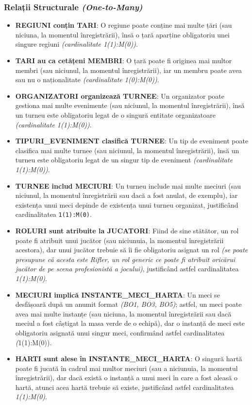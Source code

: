 \documentclass[11pt, a4paper]{article}
\begin{document}
\subsubsection{Relații Structurale \textit{(One-to-Many)}}
\begin{itemize}
    \item \textbf{REGIUNI conțin TARI}: O regiune poate conține mai multe țări (sau niciuna, la momentul înregistrării), însă o țară aparține obligatoriu unei singure regiuni \textit{(cardinalitate 1(1):M(0))}.
    \item \textbf{TARI au ca cetățeni MEMBRI}: O țară poate fi originea mai multor membri (sau niciunul, la momentul înregistrării), iar un membru poate avea sau nu o naționalitate \textit{(cardinalitate 1(0):M(0))}.
    \item \textbf{ORGANIZATORI organizează TURNEE}: Un organizator poate gestiona mai multe evenimente (sau niciunul, la momentul înregistrării), însă un turneu este obligatoriu legat de o singură entitate organizatoare \textit{(cardinalitate 1(1):M(0))}.
    \item \textbf{TIPURI\_EVENIMENT clasifică TURNEE}: Un tip de eveniment poate clasifica mai multe turnee (sau niciunul, la momentul înregistrării), însă un turneu este obligatoriu legat de un singur tip de eveniment \textit{(cardinalitate 1(1):M(0))}.
    \item \textbf{TURNEE includ MECIURI}: Un turneu include mai multe meciuri (sau niciunul, la momentul înregistrării sau dacă a fost anulat, de exemplu), iar existența unui meci depinde de existența unui turneu organizat, justificând cardinalitatea \texttt{1(1):M(0)}.
    \item \textbf{ROLURI sunt atribuite la JUCATORI}: Fiind de sine stătător, un rol poate fi atribuit unui jucător (sau niciunuia, la momentul înregistrării acestora), dar unui jucător trebuie să îi fie obligatoriu asignat un rol \textit{(se poate presupune că acesta este Rifler, un rol generic ce poate fi atribuit oricărui jucător de pe scena profesionistă a jocului)}, justificând astfel cardinalitatea \textit{1(1):M(0)}.
    \item \textbf{MECIURI implică INSTANTE\_MECI\_HARTA}: Un meci se desfășoară după un anumit format \textit{(BO1, BO3, BO5)}; astfel, un meci poate avea mai multe instanțe (sau niciuna, la momentul înregistrării sau dacă meciul a fost câștigat la masa verde de o echipă), dar o instanță de meci este obligatoriu asignată unui singur meci, confirmând astfel cardinalitatea \textit(1(1):M(0)).
    \item \textbf{HARTI sunt alese în INSTANTE\_MECI\_HARTA}: O singură hartă poate fi jucată în cadrul mai multor meciuri (sau a niciunuia, la momentul înregistrării), dar dacă există o instanță a unui meci în care a fost aleasă o hartă, atunci acea hartă trebuie să existe, justificând astfel cardinalitatea \textit{1(1):M(0)}.

\end{itemize}
\end{document}
